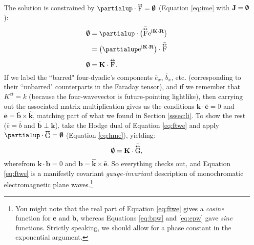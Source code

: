 \documentclass[12pt]{article}
\renewcommand{\vv}[1]{\mathbf{#1}}
\newcommand{\tightoverset}[2]{%
  \mathop{#2}\limits^{\vbox to -.5ex{\kern-0.75ex\hbox{$#1$}\vss}}}
\newcommand{\inlinedy}[1]{\tightoverset{\text{\tiny$\bm\leftrightarrow$}}{#1}}
\newcommand{\capdy}[1]{ \overset{ \text{\tiny$\bm\leftrightarrow$} }{\vphantom{\text{\small{A}}}\smash{#1}} }
\begin{document}
The solution is constrained by $\partialup \cdot \inlinedy{\mathrm{F}} = \textrm{\mbox{\boldmath $\emptyset$}}$ (Equation \ref{eq:ime} with $\vv J = \textrm{\mbox{\boldmath $\emptyset$}}$):
\begin{equation*}
\begin{split}
\textrm{\mbox{\boldmath $\emptyset$}} &= \partialup \cdot \bigl( \bar{\capdy{\mathrm{F}}} \mathrm{e}^{\mathrm{i} \mkern.5mu \vv K \cdot \vv R} \bigr) \\[2pt]
&= \left( \partialup \mathrm{e}^{\mathrm{i} \mkern.5mu \vv K \cdot \vv R} \right) \cdot \bar{\capdy{\mathrm{F}}} \\[2pt]
\textrm{\mbox{\boldmath $\emptyset$}} &= \vv K \cdot \bar{\capdy{\mathrm{F}}} .
\end{split}
\end{equation*}
If we label the ``barred" four-dyadic's components $\bar{e}_x$, $\bar{b}_x$, etc. (corresponding to their ``unbarred" counterparts in the Faraday tensor), and if we remember that $K^{ct} = k$ (because the four-wavevector is future-pointing lightlike), then carrying out the associated matrix multiplication gives us the conditions $\vv k \cdot \bar{\vv e} = 0$ and ${\bar{\vv e} = \bar{\vv b} \times \vv{\hat k}}$, matching part of what we found in Section \ref{sssec:li}. To show the rest ($\bar{e} = \bar{b}$ and $\bar{\vv b} \perp \vv k$), take the Hodge dual of Equation \ref{eq:ftwe} and apply $\partialup \cdot \inlinedy{\mathrm{G}} = \textrm{\mbox{\boldmath $\emptyset$}}$ (Equation \ref{eq:hme}), yielding:
\begin{equation*}
\textrm{\mbox{\boldmath $\emptyset$}} = \vv K \cdot \bar{\capdy{\mathrm{G}}} ,
\end{equation*}
wherefrom $\vv k \cdot \bar{\vv b} = 0$ and ${\bar{\vv b} = \vv{\hat k}} \times \bar{\vv e}$. So everything checks out, and Equation \ref{eq:ftwe} is a manifestly covariant \emph{gauge-invariant} description of monochromatic electromagnetic plane waves.\footnote{You might note that the real part of Equation \ref{eq:ftwe} gives a \emph{cosine} function for $\vv e$ and $\vv b$, whereas Equations \ref{eq:bpw} and \ref{eq:epw} gave \emph{sine} functions. Strictly speaking, we should allow for a phase constant in the exponential argument.}
\end{document}
